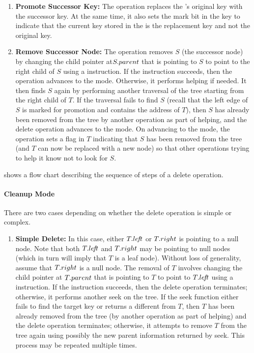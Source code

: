 \begin{limitscope}
\begin{enumerate}[leftmargin=*, noitemsep]
\item \textbf{Promote Successor Key:} The operation replaces the \targetnode's original key with the successor key. At the same time, it also sets the mark bit in the key to indicate that the current key stored in the \targetnode{} is the replacement key and not the original key.
\item \textbf{Remove Successor Node:}  The operation removes $S$ (the successor node) by changing the child pointer at$S.parent$ that is pointing to $S$ to point to the right child of $S$ using a \CAS{} instruction. If the \CAS{} instruction succeeds, then the operation advances to the \cleanup{} mode. Otherwise, it performs helping if needed. It then finds $S$ again by performing another traversal of the tree starting from the right child of $T$. If the traversal fails to find $S$ (recall that the left edge of $S$ is marked for promotion and contains the address of $T$), then $S$ has already been removed from the tree by another operation as part of helping, and the delete operation advances to the \cleanup{} mode. On advancing to the \cleanup{} mode, the operation sets a flag in $T$  indicating that $S$ has been removed from the tree (and $T$ can now be replaced with a new node) so that other operations trying to help it know not to look for $S$.
\end{enumerate}

 shows a  flow chart describing the sequence of steps of a delete operation.




\paragraph*{Cleanup Mode}
There are two cases depending on whether the delete operation is simple or complex. 

\begin{enumerate}[leftmargin=*, label=(\alph*), noitemsep]

\item \textbf{Simple Delete:}
In this case, either $T.le\!f\!t$ or $T.right$ is pointing to a null node. Note that both $T.le\!f\!t$ and $T.right$ may be pointing to null nodes (which in turn will imply that $T$ is a leaf node). Without loss of generality, assume that $T.right$ is a null node. The removal of $T$ involves changing the child pointer at $T.parent$ that is pointing to $T$ to point to $T.le\!f\!t$ using a \CAS{} instruction. If the \CAS{} instruction succeeds, then the delete operation terminates; otherwise,  it performs another seek on the tree. If the seek function either fails to find the target key or returns a \terminalnode{} different from $T$, then $T$ has been already removed from the tree (by another operation as part of helping) and the delete operation terminates; otherwise, it attempts to remove $T$ from the tree again using possibly the new parent information returned by seek. This process may be repeated multiple times. 


\end{enumerate}
\end{limitscope}
